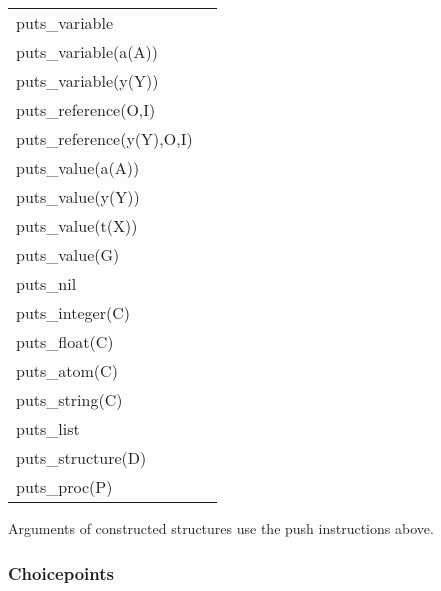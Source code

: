 \begin{tabular}{|l|l|}
\hline
puts_variable                   &         \\
puts_variable(a(A))             &                 \\
puts_variable(y(Y))             &                 \\
puts_reference(O,I)             &                 \\
puts_reference(y(Y),O,I)        &                         \\
puts_value(a(A))                &                 \\
puts_value(y(Y))                &                 \\
puts_value(t(X))                &                 \\
puts_value(G)                   &         \\
puts_nil                        &         \\
puts_integer(C)                 &         \\
puts_float(C)                   &         \\
puts_atom(C)                    &         \\
puts_string(C)                  &         \\
puts_list                       &         \\
puts_structure(D)               &                 \\
puts_proc(P)                    &         \\
\hline
\end{tabular}

Arguments of constructed structures use the push instructions above.


\subsubsection{Choicepoints}


